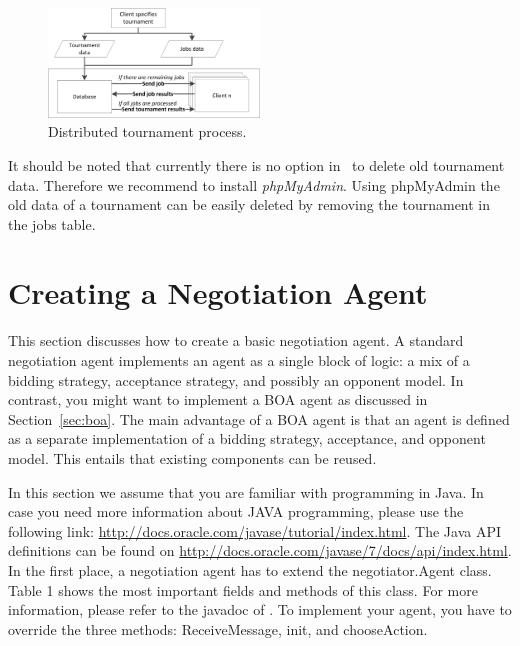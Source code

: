\documentclass[]{article}
\begin{document}
\begin{figure}[htb]
	\centering
	\includegraphics[width=0.50\textwidth]{media/DistributedGenius.png}
\caption{Distributed tournament process.}\label{fig:dtournament}
\end{figure}

It should be noted that currently there is no option in \Genius~to delete old tournament data. Therefore we recommend to install \textit{phpMyAdmin}. Using phpMyAdmin the old data of a tournament can be easily deleted by removing the tournament in the jobs table.

\section{Creating a Negotiation Agent}
This section discusses how to create a basic negotiation agent. A standard negotiation agent implements an agent as a single block of logic: a mix of a bidding strategy, acceptance strategy, and possibly an opponent model. In contrast, you might want to implement a BOA agent as discussed in Section~\ref{sec:boa}. The main advantage of a BOA agent is that an agent is defined as a separate implementation of a bidding strategy, acceptance, and opponent model. This entails that existing components can be reused.

In this section we assume that you are familiar with programming in Java. In case you need more information about JAVA programming, please use the following link: \url{http://docs.oracle.com/javase/tutorial/index.html}. The Java API definitions can be found on \url{http://docs.oracle.com/javase/7/docs/api/index.html}.
In the first place, a negotiation agent has to extend the negotiator.Agent class. Table 1 shows the most important fields and methods of this class. For more information, please refer to the javadoc of \Genius. To implement your agent, you have to override the three methods: ReceiveMessage, init, and chooseAction.
\end{document}
